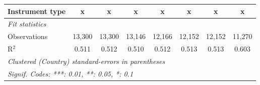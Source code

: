 \begin{table}[htbp]
\begin{tabular}{lccccccc}
      Instrument type                                                 & x              & x              & x             & x             & x             & x             & x\\  
      \midrule \emph{Fit statistics}\\
      Observations                                                    & 13,300         & 13,300         & 13,146        & 12,166        & 12,152        & 12,152        & 11,270\\  
      R$^2$                                                           & 0.511          & 0.512          & 0.510         & 0.512         & 0.513         & 0.513         & 0.603\\  
      \midrule
      \multicolumn{8}{l}{\emph{Clustered (Country) standard-errors in parentheses}}\\
      \multicolumn{8}{l}{\emph{Signif. Codes: ***: 0.01, **: 0.05, *: 0.1}}\\
   \end{tabular}
\end{table}



